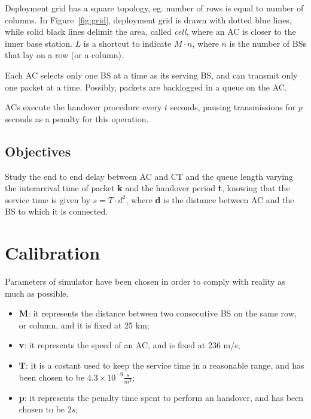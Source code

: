 \documentclass[a4paper,12pt]{article}
\begin{document}
Deployment grid has a square topology, eg. number of rows is equal to number of columns.
In Figure~\ref{fig:grid}, deployment grid is drawn with dotted blue lines, while solid black lines delimit the area, called \emph{cell}, where an AC is closer to the inner base station.
$L$ is a shortcut to indicate $M \cdot n$, where $n$ is the number of BSs that lay on a row (or a column).

Each AC selects only one BS at a time as its serving BS, and can transmit only one packet at a time.
Possibly, packets are backlogged in a queue on the AC.

ACs execute the handover procedure every $t$ seconds, pausing transmissions for $p$ seconds as a penalty for this operation.

\subsection{Objectives}
Study the end to end delay between AC and CT and the queue length varying the interarrival time of packet \textbf{k} and the handover period \textbf{t}, knowing that 
the service time is given by $s = T \cdot d^{2}$, where \textbf{d} is the distance between AC and the BS to which it is connected.

\section{Calibration}
Parameters of simulator have been chosen in order to comply with reality as much as possible.
\begin{itemize}
  \item \textbf{M}: it represents the distance between two consecutive BS on the same row, or column, and it is fixed at 25 km;
  \item \textbf{v}: it represents the speed of an AC, and is fixed at 236 m/s;
  \item \textbf{T}: it is a costant used to keep the service time in a reasonable range, and has been chosen to be $4.3 \times 10^{-9} \frac{s}{m^2}$;
  \item \textbf{p}: it represents the penalty time spent to perform an handover, and has been chosen to be $2s$;
\end{itemize}

\end{document}
